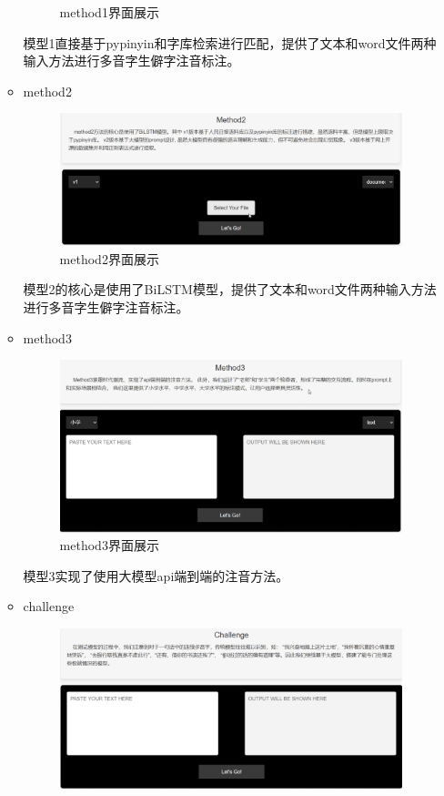 \documentclass[12pt,hyperref,a4paper,UTF8]{ctexart}
\begin{document}
\begin{itemize}
\begin{itemize}
\begin{figure}[H]
            \caption{method1界面展示}
            \label{fig3}
        \end{figure}
        模型1直接基于pypinyin和字库检索进行匹配，提供了文本和word文件两种输入方法进行多音字生僻字注音标注。
        \item method2
        \begin{figure}[H]
            \centering
            \includegraphics[width=0.7\linewidth]{figures/fig4.png}
            \caption{method2界面展示}
            \label{fig4}
        \end{figure}
        模型2的核心是使用了BiLSTM模型，提供了文本和word文件两种输入方法进行多音字生僻字注音标注。
        \item method3
        \begin{figure}[H]
            \centering
            \includegraphics[width=0.7\linewidth]{figures/fig5.png}
            \caption{method3界面展示}
            \label{fig5}
        \end{figure}
        模型3实现了使用大模型api端到端的注音⽅法。
        \item challenge
        \begin{figure}[H]
            \centering
            \includegraphics[width=0.7\linewidth]{figures/fig6.png}

\end{figure}
\end{itemize}
\end{itemize}
\end{document}
